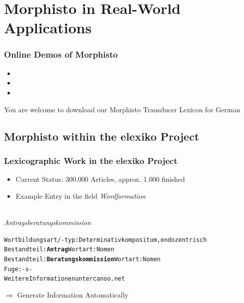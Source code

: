 \documentclass {beamer}
\begin{document}

\section{Morphisto in Real-World Applications}

\frame
{  
	\frametitle{Online Demos of Morphisto}
 \begin{itemize}
 \item {}
\item  {}
\item  {} 
\end{itemize}
You are welcome to download our Morphisto Transducer Lexicon for German 
}


\subsection{Morphisto within the elexiko Project}
\frame
{
  \frametitle{Lexicographic Work in the elexiko Project}  
\begin{itemize}
 \item Current Status: 300.000 Articles, approx. 1.000 finished
 \item Example Entry in the field \textit{Wordformation} \\
  \\
\end{itemize}
  \itshape{Antragsberatungskommission}\\
	\begin{alltt}
	\hspace{0,5cm}  Wortbildungsart/-typ:	Determinativkompositum, endozentrisch \\
	\hspace{0,5cm}  Bestandteil: \textbf{Antrag}   Wortart: Nomen\\
	\hspace{0,5cm}  Bestandteil: \textbf{Beratungskommission}   Wortart: Nomen\\
	\hspace{0,5cm}  Fuge: -s- \\
	\hspace{0,5cm}  Weitere Informationen unter canoo.net
	\end{alltt}
$\Longrightarrow$ Generate Information Automatically
}
\end{document}
